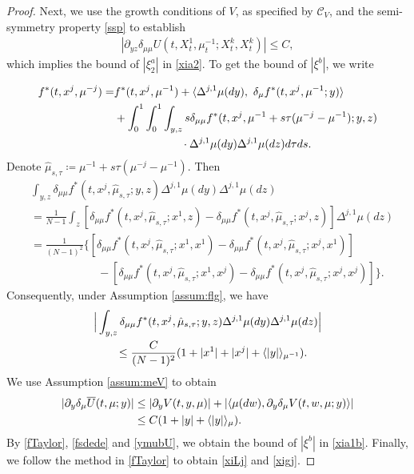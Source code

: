 \documentclass{amsart}
\theoremstyle{definition}
\theoremstyle{remark}
\def\cal{\mathcal}
\numberwithin{equation}{section}
\begin{document}
\begin{proof}
Next, we use the growth conditions of $V$,  as specified by $ {\cal C}_V$, and the semi-symmetry property \eqref{ssp} to establish
\begin{align}
|\partial_{yz}
\delta_{\mu\mu}
U(t, X^1_t,\mu_t^{-1};X_t^k, X^k_t)|\le C,
\end{align}
which implies the bound of $|\xi_2^a|$ in  \eqref{xia2}.
To get the bound of $|\xi^b|$, we write

\begin{align}
f^*(t, x^j, \mu^{-j})=& f^*(t, x^j, \mu^{-1}) +
\langle \Delta^{j,1} \mu(dy)  , \ \delta_\mu f^*(t, x^j, \mu^{-1} ; y)     \rangle \label{fTaylor} \\
& + \int_0^1\int_0^1\int_{y,z} s \delta_{\mu\mu} f^*(t,x^j, \mu^{-1}+ s\tau (\mu^{-j}-\mu^{-1}); y,z) \notag \\
&\qquad\qquad \qquad \cdot  \Delta^{j,1} \mu (dy)
 \Delta^{j,1} \mu  (dz)d\tau  ds.\notag
\end{align}
Denote $\hat\mu_{s,\tau}\coloneqq \mu^{-1}+ s\tau (\mu^{-j}-\mu^{-1}) $. Then
\begin{align*}
&\int_{y,z}\delta_{\mu\mu} f^*(t,x^j,\hat \mu_{s,\tau};y,z)\Delta^{j,1}\mu (dy)\Delta^{j,1}\mu (dz) \\
&=  \frac{1}{N-1} \int_z [\delta_{\mu\mu} f^*(t,x^j,\hat \mu_{s,\tau};x^1,z)- \delta_{\mu\mu} f^*(t,x^j,\hat \mu_{s,\tau};x^j,z) ]\Delta^{j,1}\mu (dz)\\
&=\frac{1}{(N-1)^2}\Big\{ [\delta_{\mu\mu} f^*(t,x^j,\hat \mu_{s,\tau};x^1,x^1)- \delta_{\mu\mu} f^*(t,x^j,\hat \mu_{s,\tau};x^j,x^1) ]\\
&\qquad\qquad\qquad- [\delta_{\mu\mu} f^*(t,x^j,\hat \mu_{s,\tau};x^1,x^j)- \delta_{\mu\mu} f^*(t,x^j,\hat \mu_{s,\tau};x^j,x^j) ]\Big\}.
\end{align*}
Consequently, under Assumption \ref{assum:flg}, we have
\begin{align}
&\Big|\int_{y,z}\delta_{\mu\mu} f^*(t,x^j,\hat \mu_{s,\tau};y,z)\Delta^{j,1}\mu (dy)\Delta^{j,1}\mu (dz)\Big| \label{fsdede}  \\
&\qquad \le \frac{C}{(N-1)^2} (1+|x^1|+|x^j| + \langle|y|\rangle_{\mu^{-1}} ).\notag
\end{align}
We  use Assumption \ref{assum:meV} to obtain
\begin{align}
|\partial_y \delta_\mu \overline U(t, \mu; y)|&\le
|\partial_y V(t, y,\mu)|+
|\langle \mu(dw), \partial_y\delta_\mu V(t, w, \mu; y)  \rangle | \label{ymubU}  \\
&\le C(1+ |y|+\langle |y|\rangle_\mu).\notag
\end{align}
By \eqref{fTaylor}, \eqref{fsdede} and \eqref{ymubU}, we obtain the bound of $|\xi^b|$ in \eqref{xia1b}.
Finally, we follow the method in \eqref{fTaylor} to obtain \eqref{xiLj} and \eqref{xigj}.
\end{proof}
\end{document}
